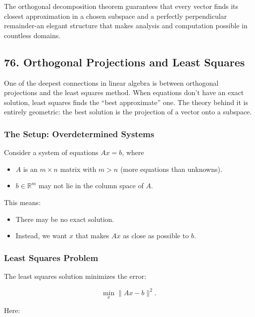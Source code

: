 \documentclass[
  letterpaper,
  DIV=11,
  numbers=noendperiod]{scrreprt}
\providecommand{\tightlist}{%
  \setlength{\itemsep}{0pt}\setlength{\parskip}{0pt}}
\begin{document}
The orthogonal decomposition theorem guarantees that every vector finds
its closest approximation in a chosen subspace and a perfectly
perpendicular remainder-an elegant structure that makes analysis and
computation possible in countless domains.

\subsection{76. Orthogonal Projections and Least
Squares}\label{orthogonal-projections-and-least-squares}

One of the deepest connections in linear algebra is between orthogonal
projections and the least squares method. When equations don't have an
exact solution, least squares finds the ``best approximate'' one. The
theory behind it is entirely geometric: the best solution is the
projection of a vector onto a subspace.

\subsubsection{The Setup: Overdetermined
Systems}\label{the-setup-overdetermined-systems}

Consider a system of equations \(Ax = b\), where

\begin{itemize}
\tightlist
\item
  \(A\) is an \(m \times n\) matrix with \(m > n\) (more equations than
  unknowns).
\item
  \(b \in \mathbb{R}^m\) may not lie in the column space of \(A\).
\end{itemize}

This means:

\begin{itemize}
\tightlist
\item
  There may be no exact solution.
\item
  Instead, we want \(x\) that makes \(Ax\) as close as possible to
  \(b\).
\end{itemize}

\subsubsection{Least Squares Problem}\label{least-squares-problem}

The least squares solution minimizes the error:

\[
\min_x \|Ax - b\|^2.
\]

Here:
\end{document}
